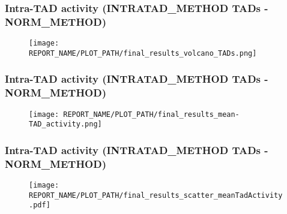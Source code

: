 
\begin{frame}
\frametitle{Intra-TAD activity (INTRATAD_METHOD TADs - NORM_METHOD)}
\begin{figure}
\texttt{[image: REPORT\_NAME/PLOT\_PATH/final\_results\_volcano\_TADs.png]}
\end{figure}
\end{frame}


\begin{frame}
\frametitle{Intra-TAD activity (INTRATAD_METHOD TADs - NORM_METHOD)}
\begin{figure}
\texttt{[image: REPORT\_NAME/PLOT\_PATH/final\_results\_mean-TAD\_activity.png]}
\end{figure}
\end{frame}


\begin{frame}
\frametitle{Intra-TAD activity (INTRATAD_METHOD TADs - NORM_METHOD)}
\begin{figure}
\texttt{[image: REPORT\_NAME/PLOT\_PATH/final\_results\_scatter\_meanTadActivity.pdf]}
\end{figure}
\end{frame}
